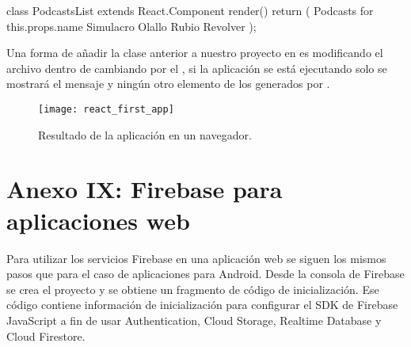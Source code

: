 %
\begin{sphinxVerbatim}[commandchars=\\\{\}]
class PodcastsList extends React.Component \PYGZob{}
  render() \PYGZob{}
    return (
       
        Podcasts for \PYGZob{}this.props.name\PYGZcb{}
          Simulacro
          Olallo Rubio
          Revolver
    );
  \PYGZcb{}
\PYGZcb{}
\end{sphinxVerbatim}

Una forma de añadir la clase anterior a nuestro proyecto
en  es modificando el archivo  dentro
de  cambiando  por el , si la aplicación
se está ejecutando solo se mostrará el mensaje y ningún otro elemento de los
generados por .


\begin{figure}[ht]
\centering
\caption{Resultado de la aplicación en un navegador.}
\texttt{[image: react\_first\_app]}
\end{figure}


\section*{Anexo IX: Firebase para aplicaciones web}

Para utilizar los servicios Firebase en una aplicación web
se siguen los mismos pasos que para el caso de 
aplicaciones para Android. Desde la consola de Firebase
se crea el proyecto y se obtiene un fragmento de código
de inicialización. Ese código  contiene información de inicialización para configurar el SDK de Firebase JavaScript a fin de usar Authentication, Cloud Storage, Realtime Database y Cloud Firestore.


